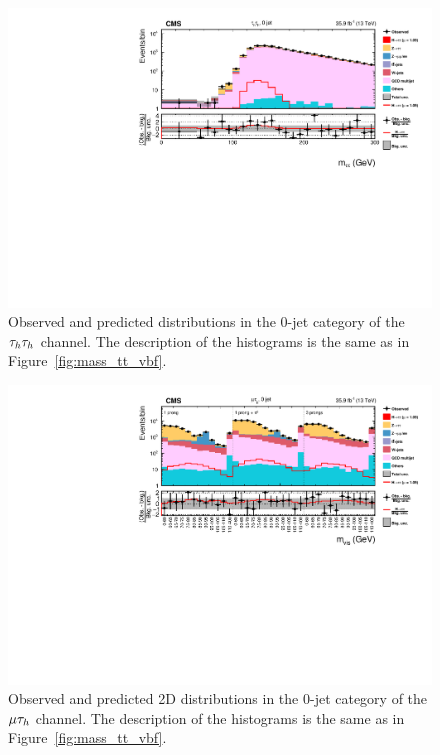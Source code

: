 \begin{figure}[htbp]
\centering
     \includegraphics[width=1.0\textwidth]{higgs_to_taus/plots/Figure_014.pdf}
     \caption{Observed and predicted distributions in the 0-jet category of the $\tau_{h}\tau_{h}$ channel. The description of the histograms is the same as in Figure~\ref{fig:mass_tt_vbf}.}
     \label{fig:mass_tt_0jet}
\end{figure}



\begin{figure}[htbp]
\centering
     \includegraphics[width=1.0\textwidth]{higgs_to_taus/plots/Figure_015.pdf}
     \caption{Observed and predicted 2D distributions in the 0-jet category of the $\mu\tau_{h}$ channel. The description of the histograms is the same as in Figure~\ref{fig:mass_tt_vbf}.}
     \label{fig:mass_mt_0jet}
\end{figure}

